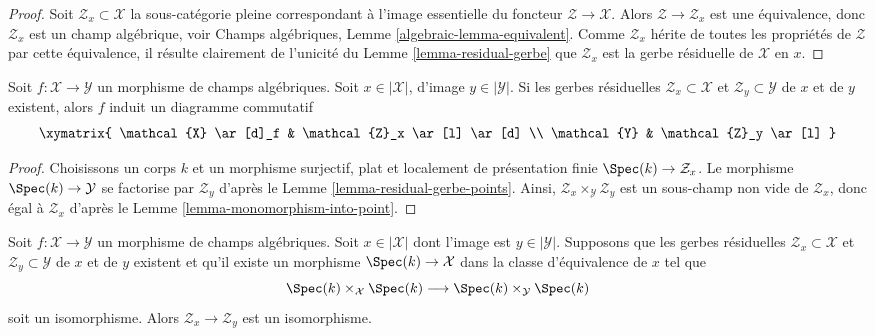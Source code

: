 \begin{proof}
Soit $\mathcal{Z}_x \subset \mathcal{X}$ la sous-catégorie pleine correspondant
à l'image essentielle du foncteur $\mathcal{Z} \to \mathcal{X}$.
Alors $\mathcal{Z} \to \mathcal{Z}_x$ est une équivalence, donc
$\mathcal{Z}_x$ est un champ algébrique, voir
Champs algébriques, Lemme \ref{algebraic-lemma-equivalent}.
Comme $\mathcal{Z}_x$ hérite de toutes les propriétés de $\mathcal{Z}$ par
cette équivalence, il résulte clairement de l'unicité du
Lemme \ref{lemma-residual-gerbe}
que $\mathcal{Z}_x$ est la gerbe résiduelle de $\mathcal{X}$ en $x$.
\end{proof}

\begin{lemma}
\label{lemma-residual-gerbe-functorial}
Soit $f : \mathcal{X} \to \mathcal{Y}$ un morphisme de champs algébriques.
Soit $x \in |\mathcal{X}|$, d'image $y \in |\mathcal{Y}|$.
Si les gerbes résiduelles $\mathcal{Z}_x \subset \mathcal{X}$
et $\mathcal{Z}_y \subset \mathcal{Y}$ de $x$ et de $y$ existent,
alors $f$ induit un diagramme commutatif
$$
\xymatrix{
\mathcal{X} \ar[d]_f & \mathcal{Z}_x \ar[l] \ar[d] \\
\mathcal{Y} & \mathcal{Z}_y \ar[l]
}
$$
\end{lemma}

\begin{proof}
Choisissons un corps $k$ et un morphisme surjectif, plat et localement de présentation finie
$\Spec(k) \to \mathcal{Z}_x$. Le morphisme
$\Spec(k) \to \mathcal{Y}$ se factorise par $\mathcal{Z}_y$ d'après le
Lemme \ref{lemma-residual-gerbe-points}.
Ainsi, $\mathcal{Z}_x \times_\mathcal{Y} \mathcal{Z}_y$
est un sous-champ non vide de $\mathcal{Z}_x$,
donc égal à $\mathcal{Z}_x$ d'après le Lemme \ref{lemma-monomorphism-into-point}.
\end{proof}

\begin{lemma}
\label{lemma-residual-gerbe-isomorphic}
Soit $f : \mathcal{X} \to \mathcal{Y}$ un morphisme de champs algébriques.
Soit $x \in |\mathcal{X}|$ dont l'image est $y \in |\mathcal{Y}|$.
Supposons que les gerbes résiduelles $\mathcal{Z}_x \subset \mathcal{X}$
et $\mathcal{Z}_y \subset \mathcal{Y}$ de $x$ et de $y$ existent
et qu'il existe un morphisme $\Spec(k) \to \mathcal{X}$
dans la classe d'équivalence de $x$ tel que
$$
\Spec(k) \times_\mathcal{X} \Spec(k)
\longrightarrow
\Spec(k) \times_\mathcal{Y} \Spec(k)
$$
soit un isomorphisme. Alors $\mathcal{Z}_x \to \mathcal{Z}_y$
est un isomorphisme.
\end{lemma}

